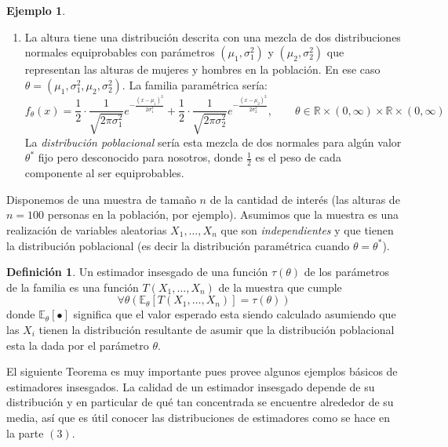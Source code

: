 \documentclass[12pt]{amsart}
\theoremstyle{definition}
\newtheorem{definition}[lemma]{Definición}
\newtheorem{examplex}[lemma]{Ejemplo}
\newcommand{\RR}{\ensuremath{\mathbb{R}}}
\newcommand{\EE}{\ensuremath{\mathbb{E}}}
\begin{document}
\begin{examplex}
\begin{enumerate}
        \item La altura tiene una distribución descrita con una mezcla de dos distribuciones normales equiprobables con parámetros $(\mu_1,\sigma_1^2)$ y $(\mu_2,\sigma_2^2)$ que representan las alturas de mujeres y hombres en la población. En ese caso $\theta=\left(\mu_1,\sigma_1^2,\mu_2,\sigma_2^2\right)$.       
        La familia paramétrica sería:
        \[f_{\theta}(x)=\frac{1}{2}\cdot\frac{1}{\sqrt{2\pi\sigma_1^2}} e^{-\frac{(x-\mu_1)^2}{2\sigma_1^2}}+\frac{1}{2}\cdot\frac{1}{\sqrt{2\pi\sigma_2^2}} e^{-\frac{(x-\mu_2)^2}{2\sigma_2^2}},\qquad \theta\in\RR\times(0,\infty)\times\RR\times(0,\infty)\]
        La \emph{distribución poblacional} sería esta mezcla de dos normales para algún valor $\theta^*$ fijo pero desconocido para nosotros, donde $\frac{1}{2}$ es el peso de cada componente al ser equiprobables.
    \end{enumerate}
\end{examplex}

Disponemos de una muestra de tamaño $n$ de la cantidad de interés (las alturas de $n=100$ personas en la población, por ejemplo). Asumimos que la muestra es una realización de variables aleatorias $X_1,\dots, X_n$ que son \emph{independientes} y que tienen la distribución poblacional (es decir la distribución paramétrica cuando $\theta=\theta^*$).

\begin{definition} \label{def: insesgado} Un estimador insesgado de una función  $\tau(\theta)$ de los parámetros de la familia es una función $T(X_1,\dots, X_n)$ de la muestra que cumple 
    \[\forall \theta \left(\EE_\theta[T(X_1,\dots, X_n)]= \tau(\theta)\right) \]
    donde $\EE_\theta[\bullet]$ significa que el valor esperado esta siendo calculado asumiendo que las $X_i$ tienen la distribución resultante de asumir que la distribución poblacional esta la dada por el parámetro $\theta$.    
\end{definition}

El siguiente Teorema es muy importante pues provee algunos ejemplos básicos de estimadores insesgados. La calidad de un estimador insesgado depende de su distribución y en particular de qué tan concentrada se encuentre alrededor de su media, así que es útil conocer las distribuciones de estimadores como se hace en la parte $(3)$.
\end{document}
